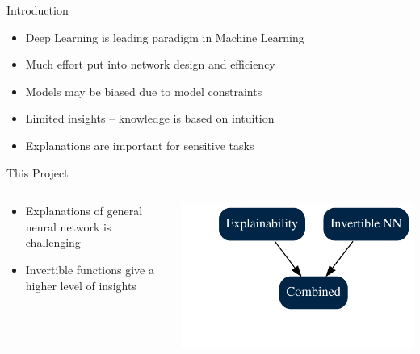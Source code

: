 \begin{frame}{Introduction}
	\begin{itemize}
		\item Deep Learning is \alert{leading paradigm} in Machine Learning
		\item Much effort put into network \alert{design} and \alert{efficiency}
		\item Models may be \alert{biased} due to model constraints
		\item Limited insights -- knowledge is based on \alert{intuition}
		\item \alert{Explanations} are important for sensitive tasks
	\end{itemize}
\end{frame}


\begin{frame}{This Project}
	\begin{columns}
		\begin{column}{0.45\textwidth}
			\begin{itemize}
				\item Explanations of general neural network is challenging
				\item Invertible functions give a higher level of insights
			\end{itemize}
		\end{column}
		\begin{column}{0.45\textwidth}
			\centering
			\includegraphics[width=\textwidth]{project}
		\end{column}
	\end{columns}
\end{frame}
